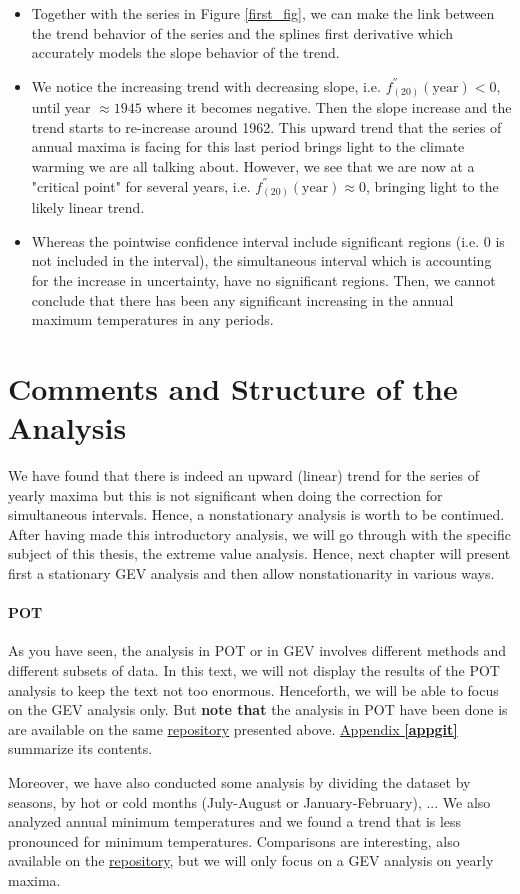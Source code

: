 \begin{itemize}
\item Together with the series in Figure \ref{first_fig}, we can make the link between the trend behavior of the series and the splines first derivative which accurately models the slope behavior of the trend. 
\item We notice the increasing trend with decreasing slope, i.e. $ f_{(20)}^{''}(\text{year})<0$, until year $\approx 1945$ where it becomes negative. Then the slope increase and the trend starts to re-increase around 1962. This upward trend that the series of annual maxima is facing for this last period brings light to the climate warming we are all talking about. However, we see that we are now at a "critical point" for several years, i.e. $f_{(20)}^{''}(\text{year})\approx 0$, bringing light to the likely linear trend. 

\item  Whereas the pointwise confidence interval include significant regions (i.e. 0 is not included in the interval), the simultaneous interval which is accounting for the increase in uncertainty, have no significant regions. Then, we cannot conclude that there has been any significant increasing in the annual maximum temperatures in any periods.

\end{itemize}


\section{Comments and Structure of the Analysis }

 We have found that there is indeed an upward (linear) trend for the series of yearly maxima but this is not significant when doing the correction for simultaneous intervals.
Hence, a nonstationary analysis is worth to be continued.
After having made this introductory analysis, we will go through with the specific subject of this thesis, the extreme value analysis. Hence, next chapter will present first a stationary GEV analysis and then allow nonstationarity in various ways.


\paragraph*{POT} 
As you have seen, the analysis in POT or in GEV involves different methods and different  subsets of data. In this text, we will not display the results of the POT analysis to keep the text not too enormous. Henceforth, we will be able to focus on the GEV analysis only. But \textbf{note that} the analysis in POT have been done is are available on the same \href{https://github.com/proto4426/PissoortThesis}{repository} presented above.
\hyperref[appgit]{Appendix\textbf{ \ref{appgit}}} summarize its contents.


Moreover, we have also conducted some analysis by dividing the dataset by seasons, by hot or cold months (July-August or January-February), ... We also analyzed annual minimum temperatures and we found a trend that is less pronounced for minimum temperatures.
Comparisons are interesting, also available on the \href{https://github.com/proto4426/PissoortThesis}{repository}, but we will only focus on a GEV analysis on yearly maxima.